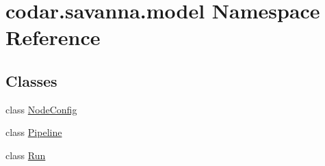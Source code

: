 \hypertarget{namespacecodar_1_1savanna_1_1model}{}\section{codar.\+savanna.\+model Namespace Reference}
\label{namespacecodar_1_1savanna_1_1model}
\subsection*{Classes}
\begin{DoxyCompactItemize}
\item 
class \hyperlink{classcodar_1_1savanna_1_1model_1_1_node_config}{Node\+Config}
\item 
class \hyperlink{classcodar_1_1savanna_1_1model_1_1_pipeline}{Pipeline}
\item 
class \hyperlink{classcodar_1_1savanna_1_1model_1_1_run}{Run}
\end{DoxyCompactItemize}

